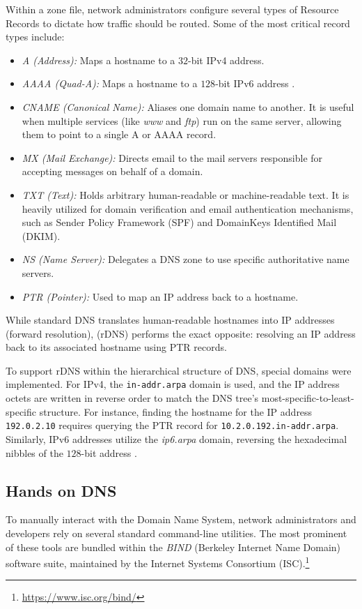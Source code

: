 Within a zone file, network administrators configure several types of Resource Records to dictate how traffic should be routed. Some of the most critical record types include:
\begin{itemize}
    \item \emph{A (Address):} Maps a hostname to a \(32\)-bit IPv4 address.
    \item \emph{AAAA (Quad-A):} Maps a hostname to a \(128\)-bit IPv6 address \cite{rfc3596}.
    \item \emph{CNAME (Canonical Name):} Aliases one domain name to another. It is useful when multiple services (like \emph{www} and \emph{ftp}) run on the same server, allowing them to point to a single A or AAAA record.
    \item \emph{MX (Mail Exchange):} Directs email to the mail servers responsible for accepting messages on behalf of a domain.
    \item \emph{TXT (Text):} Holds arbitrary human-readable or machine-readable text. It is heavily utilized for domain verification and email authentication mechanisms, such as Sender Policy Framework (SPF) and DomainKeys Identified Mail (DKIM).
    \item \emph{NS (Name Server):} Delegates a DNS zone to use specific authoritative name servers.
    \item \emph{PTR (Pointer):} Used to map an IP address back to a hostname.
\end{itemize}

While standard DNS translates human-readable hostnames into IP addresses (forward resolution),  (rDNS) performs the exact opposite: resolving an IP address back to its associated hostname using PTR records.

To support rDNS within the hierarchical structure of DNS, special domains were implemented. For IPv4, the \texttt{in-addr.arpa} domain is used, and the IP address octets are written in reverse order to match the DNS tree's most-specific-to-least-specific structure. For instance, finding the hostname for the IP address \texttt{192.0.2.10} requires querying the PTR record for \texttt{10.2.0.192.in-addr.arpa}. Similarly, IPv6 addresses utilize the \emph{ip6.arpa} domain, reversing the hexadecimal nibbles of the \(128\)-bit address \cite{rfc3596}.

\subsection{Hands on DNS}
To manually interact with the Domain Name System, network administrators and developers rely on several standard command-line utilities. 
The most prominent of these tools are bundled within the \emph{BIND} (Berkeley Internet Name Domain) software suite, maintained by the Internet Systems Consortium (ISC).\footnote{\url{https://www.isc.org/bind/}}

